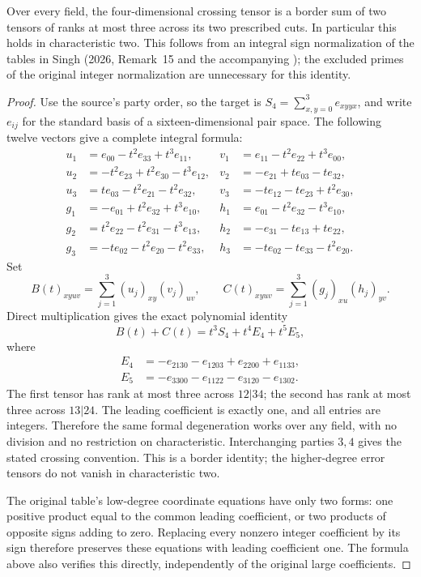 \begin{proposition}
\label{pg:border-sign}
Over every field, the four-dimensional crossing tensor is a
border sum of two tensors of ranks at most three across its two
prescribed cuts. In particular this holds in characteristic two.
This follows from an integral sign normalization of the tables
in Singh (2026, Remark~15 and the accompanying
); the excluded primes of the
original integer normalization are unnecessary for this identity.
\end{proposition}
\begin{proof}
Use the source's party order, so the target is
$S_4=\sum_{x,y=0}^3 e_{xyyx}$, and write $e_{ij}$ for the
standard basis of a sixteen-dimensional pair space.
The following twelve vectors give a complete integral formula:
\begin{align*}
 u_1&=e_{00}-t^2e_{33}+t^3e_{11},&
 v_1&=e_{11}-t^2e_{22}+t^3e_{00},\\
 u_2&=-t^2e_{23}+t^2e_{30}-t^3e_{12},&
 v_2&=-e_{21}+te_{03}-te_{32},\\
 u_3&=te_{03}-t^2e_{21}-t^2e_{32},&
 v_3&=-te_{12}-te_{23}+t^2e_{30},\\
 g_1&=-e_{01}+t^2e_{32}+t^3e_{10},&
 h_1&=e_{01}-t^2e_{32}-t^3e_{10},\\
 g_2&=t^2e_{22}-t^2e_{31}-t^3e_{13},&
 h_2&=-e_{31}-te_{13}+te_{22},\\
 g_3&=-te_{02}-t^2e_{20}-t^2e_{33},&
 h_3&=-te_{02}-te_{33}-t^2e_{20}.
\end{align*}
Set
\[
 B(t)_{xyuv}=\sum_{j=1}^3(u_j)_{xy}(v_j)_{uv},\qquad
 C(t)_{xyuv}=\sum_{j=1}^3(g_j)_{xu}(h_j)_{yv}.
\]
Direct multiplication gives the exact polynomial identity
\[
 B(t)+C(t)=t^3S_4+t^4E_4+t^5E_5,
 \tag{PG-BORDER-sign}
\]
where
\begin{align*}
 E_4&=-e_{2130}-e_{1203}+e_{2200}+e_{1133},\\
 E_5&=-e_{3300}-e_{1122}-e_{3120}-e_{1302}.
\end{align*}
The first tensor has rank at most three across $12|34$;
the second has rank at most three across $13|24$.
The leading coefficient is exactly one, and all entries are
integers. Therefore the same formal degeneration works over
any field, with no division and no restriction on characteristic.
Interchanging parties $3,4$ gives the stated crossing convention.
This is a border identity; the higher-degree error tensors do
not vanish in characteristic two.

The original table's low-degree coordinate equations have only
two forms: one positive product equal to the common leading
coefficient, or two products of opposite signs adding to zero.
Replacing every nonzero integer coefficient by its sign therefore
preserves these equations with leading coefficient one. The
formula above also verifies this directly, independently of the
original large coefficients.


\end{proof}
